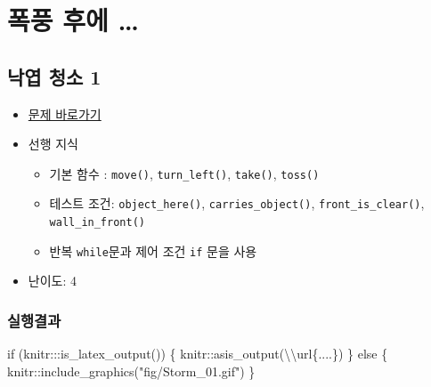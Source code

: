 \documentclass[
  b5paperpaper,
  DIV=11,
  numbers=noendperiod]{scrreprt}
\newenvironment{Shaded}{\begin{snugshade}}{\end{snugshade}}
\newcommand{\ControlFlowTok}[1]{\textcolor[rgb]{0.00,0.23,0.31}{#1}}
\newcommand{\FunctionTok}[1]{\textcolor[rgb]{0.28,0.35,0.67}{#1}}
\newcommand{\NormalTok}[1]{\textcolor[rgb]{0.00,0.23,0.31}{#1}}
\newcommand{\SpecialCharTok}[1]{\textcolor[rgb]{0.37,0.37,0.37}{#1}}
\newcommand{\StringTok}[1]{\textcolor[rgb]{0.13,0.47,0.30}{#1}}
\providecommand{\tightlist}{%
  \setlength{\itemsep}{0pt}\setlength{\parskip}{0pt}}\usepackage{longtable,booktabs,array}
\begin{document}
\hypertarget{storm}{%
\chapter{폭풍 후에 \ldots{}}\label{storm}}

\hypertarget{storm-01}{%
\section{낙엽 청소 1}\label{storm-01}}

\begin{itemize}
\tightlist
\item
  \href{https://reeborg.ca/reeborg.html?lang=ko-en\&mode=python\&menu=worlds\%2Fmenus\%2Freeborg_intro_en.json\&name=Storm\%201\&url=worlds\%2Ftutorial_en\%2Fstorm1.json}{문제
  바로가기}
\item
  선행 지식

  \begin{itemize}
  \tightlist
  \item
    기본 함수 : \texttt{move()}, \texttt{turn\_left()}, \texttt{take()},
    \texttt{toss()}
  \item
    테스트 조건: \texttt{object\_here()}, \texttt{carries\_object()},
    \texttt{front\_is\_clear()}, \texttt{wall\_in\_front()}
  \item
    반복 \texttt{while}문과 제어 조건 \texttt{if} 문을 사용
  \end{itemize}
\item
  난이도: 4
\end{itemize}

\hypertarget{uxc2e4uxd589uxacb0uxacfc-28}{%
\subsection{실행결과}\label{uxc2e4uxd589uxacb0uxacfc-28}}

\begin{Shaded}
\begin{Highlighting}[]
\ControlFlowTok{if}\NormalTok{ (knitr}\SpecialCharTok{:::}\FunctionTok{is\_latex\_output}\NormalTok{()) \{}
\NormalTok{  knitr}\SpecialCharTok{::}\FunctionTok{asis\_output}\NormalTok{(}\StringTok{\textquotesingle{}}\SpecialCharTok{\textbackslash{}\textbackslash{}}\StringTok{url\{....\}\textquotesingle{}}\NormalTok{)}
\NormalTok{\} }\ControlFlowTok{else}\NormalTok{ \{}
\NormalTok{  knitr}\SpecialCharTok{::}\FunctionTok{include\_graphics}\NormalTok{(}\StringTok{"fig/Storm\_01.gif"}\NormalTok{)}
\NormalTok{\}}
\end{Highlighting}
\end{Shaded}
\end{document}
